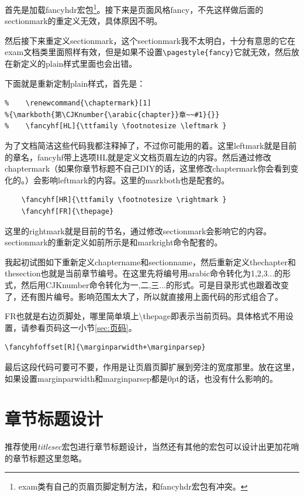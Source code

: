 \documentclass[11pt,oneside]{book}
\begin{document}
首先是加载fancyhdr宏包\footnote{exam类有自己的页眉页脚定制方法，和fancyhdr宏包有冲突。}。接下来是页面风格fancy，不先这样做后面的sectionmark的重定义无效，具体原因不明。

然后接下来重定义sectionmark，这个sectionmark我不太明白，十分有意思的它在exam文档类里面照样有效，但是如果不设置\verb+\pagestyle{fancy}+它就无效，然后放在新定义的plain样式里面也会出错。

下面就是重新定制plain样式，首先是：
\begin{Verbatim}
%    \renewcommand{\chaptermark}[1]
%{\markboth{第\CJKnumber{\arabic{chapter}}章~~#1}{}}
%    \fancyhf[HL]{\ttfamily \footnotesize \leftmark }
\end{Verbatim}
为了文档简洁这些代码我都注释掉了，不过你可能用的着。这里leftmark就是目前的章名，fancyhf带上选项HL就是定义文档页眉左边的内容。然后通过修改chaptermark（如果你章节标题不自己DIY的话，这里修改chaptermark你会看到变化的。）会影响leftmark的内容。这里的markboth也是配套的。

\begin{Verbatim}
    \fancyhf[HR]{\ttfamily \footnotesize \rightmark }
    \fancyhf[FR]{\thepage}
\end{Verbatim}
这里的rightmark就是目前的节名，通过修改sectionmark会影响它的内容。sectionmark的重新定义如前所示是和markright命令配套的。


我起初试图如下重新定义chaptername和sectionname，然后重新定义thechapter和thesection也就是当前章节编号。在这里先将编号用arabic命令转化为1,2,3...的形式，然后用CJKnumber命令转化为一,二,三...的形式。可是目录形式也跟着改变了，还有图片编号。影响范围太大了，所以就直接用上面代码的形式组合了。


FR也就是右边页脚处，哪里简单填上\textbackslash thepage即表示当前页码。具体格式不用设置，请参看页码这一小节\ref{sec:页码}。

\begin{Verbatim}
\fancyhfoffset[R]{\marginparwidth+\marginparsep}
\end{Verbatim}
最后这段代码可要可不要，作用是让页眉页脚扩展到旁注的宽度那里。放在这里，如果设置marginparwidth和marginparsep都是0pt的话，也没有什么影响的。



\chapter{章节标题设计}
推荐使用\emph{titlesec}宏包进行章节标题设计，当然还有其他的宏包可以设计出更加花哨的章节标题这里忽略。
\end{document}
